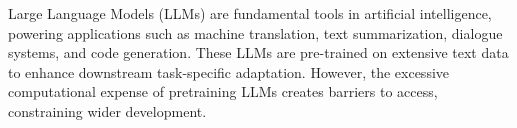

Large Language Models (LLMs) are fundamental tools in artificial intelligence, powering applications such as machine translation, text summarization, dialogue systems, and code generation. These LLMs are pre-trained on extensive text data to enhance downstream task-specific adaptation. However, the excessive computational expense of pretraining LLMs creates barriers to access, constraining wider development.

